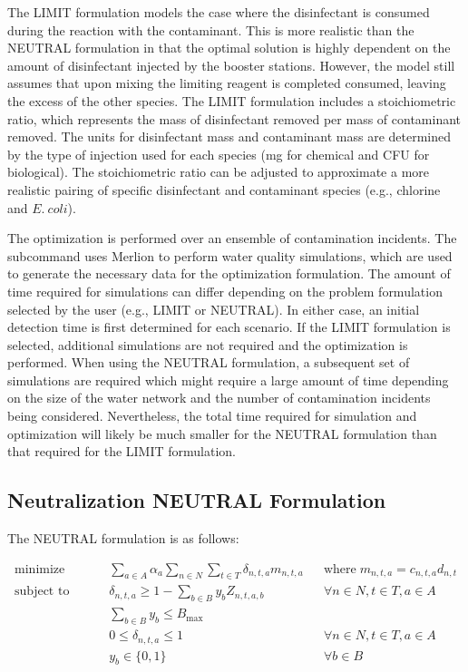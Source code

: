 The LIMIT formulation models the case where the disinfectant is consumed 
during the reaction with the contaminant. This is more realistic than the 
NEUTRAL formulation in that the optimal solution is highly 
dependent on the amount of disinfectant injected by the booster 
stations. However, the model still assumes that upon mixing the limiting 
reagent is completed consumed, leaving the excess of the other species. 
The LIMIT formulation includes a stoichiometric ratio, which represents 
the mass of disinfectant removed per mass of contaminant removed. 
The units for disinfectant mass and contaminant mass are determined by the type of injection used for each species 
(mg for chemical and CFU for biological).  
The stoichiometric ratio
can be adjusted to approximate a more realistic pairing of specific disinfectant 
and contaminant species (e.g., chlorine and $E.~coli$).

The optimization is performed over an ensemble of contamination incidents. 
The  subcommand uses 
Merlion to perform water quality simulations, which are used to generate the 
necessary data for the optimization formulation. The amount of time required 
for simulations can differ depending on the problem formulation selected by the 
user (e.g., LIMIT or NEUTRAL). 
In either case, an initial detection time is first
determined for each scenario. If the LIMIT formulation is 
selected, additional simulations are not required and the optimization is performed. 
When using the NEUTRAL formulation, a subsequent set of simulations are 
required which might require a large amount of time depending on the size of the 
water network and the number of contamination incidents being considered. Nevertheless, the 
total time required for simulation and optimization will likely be much smaller 
for the NEUTRAL formulation than that required for the LIMIT formulation.
\fi

\subsection{Neutralization NEUTRAL Formulation}\label{booster_mip_neutral}

The NEUTRAL formulation is as follows:

\begin{align}
\textrm{minimize }\qquad &\sum_{a\in A}\alpha_a\sum_{n\in N}\sum_{t\in T} \delta_{n,t,a} m_{n,t,a} &&\textrm{where} \; m_{n,t,a}=c_{n,t,a}d_{n,t} \label{eq:mip_neutral_1} \\
\textrm{subject to } \qquad &\delta_{n,t,a} \geq 1-\sum_{b\in B}y_{b}Z_{n,t,a,b} &&\forall{n\in N,t\in T,a\in A} \label{eq:mip_neutral_2} \\
&\sum_{b\in B}y_{b} \leq B_{\max} \label{eq:mip_neutral_3} \\
&0\leq\delta_{n,t,a} \leq 1 &&\forall{n\in N,t\in T,a\in A} \label{eq:mip_neutral_4} \\
&y_{b} \in \{0,1\} &&\forall b\in B \label{eq:mip_neutral_5}
\end{align}

